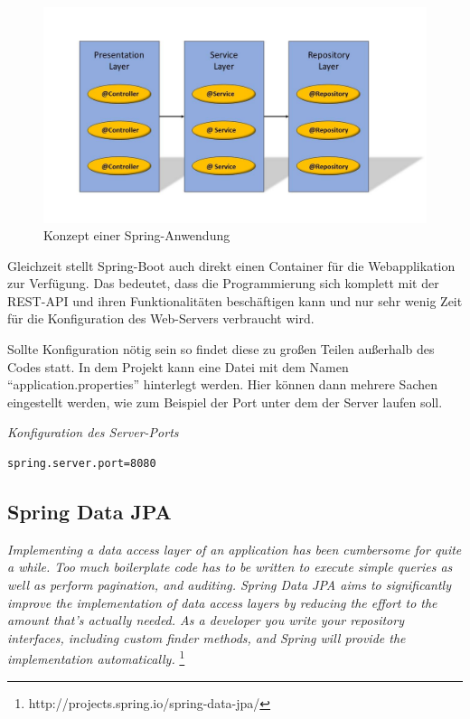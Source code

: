 \begin{figure}[htp]     %
\centering
\includegraphics[width=1\textwidth]{bilder/SpringLayers} 
\caption[Der Grafik \url{http://image.slidesharecdn.com/springsourceusi2009v3-0-090702135517-phpapp01/95/developing-modular-java-applications-13-728.jpg?cb=1246543977} nachempfunden]{Konzept einer Spring-Anwendung}
\end{figure} 

Gleichzeit stellt Spring-Boot auch direkt einen Container für die Webapplikation zur Verfügung. Das bedeutet, dass die Programmierung sich komplett mit der REST-API und ihren Funktionalitäten beschäftigen kann und nur sehr wenig Zeit für die Konfiguration des Web-Servers verbraucht wird.

Sollte Konfiguration nötig sein so findet diese zu großen Teilen außerhalb des Codes statt. In dem Projekt kann eine Datei mit dem Namen ``application.properties'' hinterlegt werden. Hier können dann mehrere Sachen eingestellt werden, wie zum Beispiel der Port unter dem der Server laufen soll.\\

\begin{minipage}{\textwidth}
\emph{Konfiguration des Server-Ports}
\begin{lstlisting}
spring.server.port=8080
\end{lstlisting} 
\end{minipage}

\subsection{Spring Data JPA}

\emph{\glqq   
Implementing a data access layer of an application has been cumbersome for quite a while. Too much boilerplate code has to be written to execute simple queries as well as perform pagination, and auditing. Spring Data JPA aims to significantly improve the implementation of data access layers by reducing the effort to the amount that’s actually needed. As a developer you write your repository interfaces, including custom finder methods, and Spring will provide the implementation automatically.
\grqq} \footnote{http://projects.spring.io/spring-data-jpa/} \\

